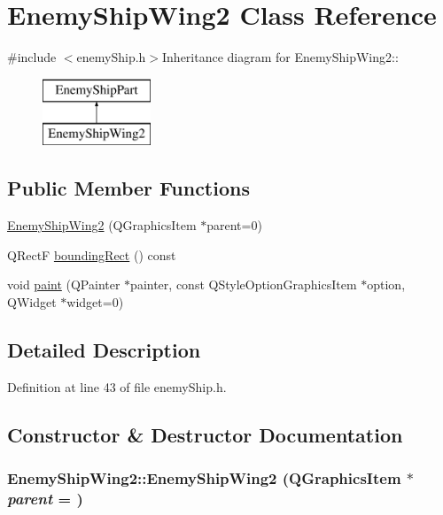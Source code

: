 \hypertarget{class_enemy_ship_wing2}{
\section{EnemyShipWing2 Class Reference}
\label{class_enemy_ship_wing2}
}


{\ttfamily \#include $<$enemyShip.h$>$}Inheritance diagram for EnemyShipWing2::\begin{figure}[H]
\begin{center}
\leavevmode
\includegraphics[height=2cm]{class_enemy_ship_wing2}
\end{center}
\end{figure}
\subsection*{Public Member Functions}
\begin{DoxyCompactItemize}
\item 
\hyperlink{class_enemy_ship_wing2_abe47ecf923fdcd3fb082f171ebf5f4da}{EnemyShipWing2} (QGraphicsItem $\ast$parent=0)
\item 
QRectF \hyperlink{class_enemy_ship_wing2_aa7bb8e6e12d7f1853fbcfdac6d6a714a}{boundingRect} () const 
\item 
void \hyperlink{class_enemy_ship_wing2_a85748bd6053efae322ff6eea88a31dea}{paint} (QPainter $\ast$painter, const QStyleOptionGraphicsItem $\ast$option, QWidget $\ast$widget=0)
\end{DoxyCompactItemize}


\subsection{Detailed Description}


Definition at line 43 of file enemyShip.h.

\subsection{Constructor \& Destructor Documentation}
\hypertarget{class_enemy_ship_wing2_abe47ecf923fdcd3fb082f171ebf5f4da}{
\subsubsection[{EnemyShipWing2}]{\setlength{\rightskip}{0pt plus 5cm}EnemyShipWing2::EnemyShipWing2 (QGraphicsItem $\ast$ {\em parent} = {})}}
\label{class_enemy_ship_wing2_abe47ecf923fdcd3fb082f171ebf5f4da}


